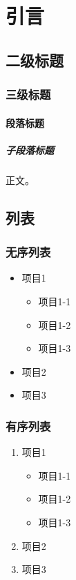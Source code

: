 \section{引言}\label{sec:introduction}

\subsection{二级标题}

\subsubsection{三级标题}

\paragraph{段落标题}

\subparagraph{子段落标题}

正文。

\subsection{列表}

\subsubsection{无序列表}

\begin{itemize}
    \item 项目1
          \begin{itemize}
              \item 项目1-1
              \item 项目1-2
              \item 项目1-3
          \end{itemize}
    \item 项目2
    \item 项目3
\end{itemize}

\subsubsection{有序列表}

\begin{enumerate}
    \item 项目1
          \begin{itemize}
              \item 项目1-1
              \item 项目1-2
              \item 项目1-3
          \end{itemize}
    \item 项目2
    \item 项目3
\end{enumerate}

